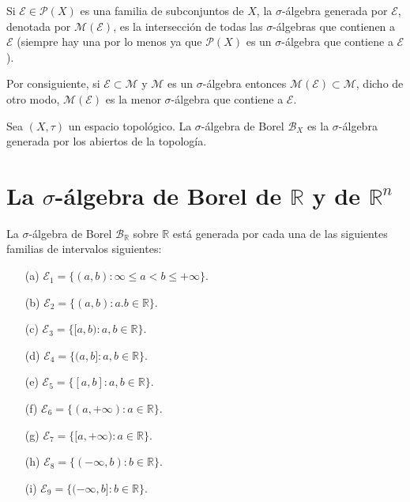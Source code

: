 \begin{defi}
    Si $\mathcal{E} \in \mathcal{P}(X)$ es una familia de subconjuntos de $X$, la $\sigma$-álgebra generada por $\mathcal{E}$, denotada por $\mathcal{M(E)}$, es la intersección de todas las $\sigma$-álgebras que contienen a $\mathcal{E}$ (siempre hay una por lo menos ya que $\mathcal{P}(X)$ es un $\sigma$-álgebra que contiene a $\mathcal{E}$).

    Por consiguiente, si $\mathcal{E} \subset \mathcal{M}$ y $\mathcal{M}$ es un $\sigma$-álgebra entonces $\mathcal{M(E)} \subset \mathcal{M}$, dicho de otro modo, $\mathcal{M(E)}$ es la menor $\sigma$-álgebra que contiene a $\mathcal{E}$.
\end{defi}
\begin{defi}
    Sea $(X, \tau)$ un espacio topológico. La $\sigma$-álgebra de Borel $\mathcal{B}_X$ es la $\sigma$-álgebra generada por los abiertos de la topología.
\end{defi}

\newpage
\section{La $\sigma$-álgebra de Borel de $\mathbb{R}$ y de $\mathbb{R}^n$}
\begin{prop}
    La $\sigma$-álgebra de Borel $\mathcal{B}_{\mathbb{R}}$ sobre $\mathbb{R}$ está generada por cada una de las siguientes familias de intervalos siguientes:
    \begin{enumerate}
        \item[(a)] $\mathcal{E}_1 = \{(a,b) : \infty \leq a < b \leq +\infty \}$.
        \item[(b)] $\mathcal{E}_2 = \{(a,b) : a.b \in \mathbb{R} \}$.
        \item[(c)] $\mathcal{E}_3 = \{[a,b) : a,b \in \mathbb{R} \}$.
        \item[(d)] $\mathcal{E}_4 = \{(a,b] : a,b \in \mathbb{R} \}$.
        \item[(e)] $\mathcal{E}_5 = \{[a,b] : a,b \in \mathbb{R} \}$.
        \item[(f)] $\mathcal{E}_6 = \{(a,+\infty) : a \in \mathbb{R} \}$.
        \item[(g)] $\mathcal{E}_7 = \{[a,+\infty) : a \in \mathbb{R} \}$.
        \item[(h)] $\mathcal{E}_8 = \{(-\infty,b) : b \in \mathbb{R} \}$.
        \item[(i)] $\mathcal{E}_9 = \{(-\infty,b] : b \in \mathbb{R} \}$.
    \end{enumerate}
\end{prop}

